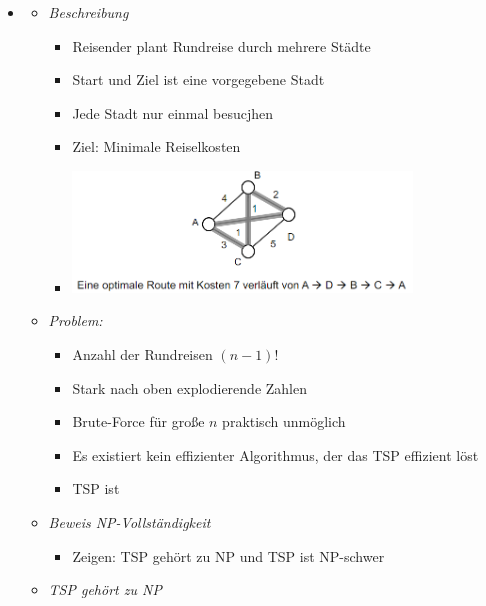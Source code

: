 \documentclass[
    12pt,
    a4paper,
    ngerman,
    color=3b,%
    marginpar=false,
    colorback=false,
    leqno,
]{tudaexercise}
\begin{document}
\begin{itemize}
          \pagebreak

    \item {}
          \begin{itemize}
              \item \textit{Beschreibung}
                    \begin{itemize}
                        \item Reisender plant Rundreise durch mehrere Städte
                        \item Start und Ziel ist eine vorgegebene Stadt
                        \item Jede Stadt nur einmal besucjhen
                        \item Ziel: Minimale Reiselkosten
                        \item[] \includegraphics[width=9cm]{pictures/tsp1.PNG}
                    \end{itemize}
              \item \textit{Problem:}
                    \begin{itemize}
                        \item Anzahl der Rundreisen $(n-1)!$
                        \item Stark nach oben explodierende Zahlen
                        \item Brute-Force für große $n$ praktisch unmöglich
                        \item Es existiert kein effizienter Algorithmus, der das TSP effizient löst
                        \item TSP ist 
                    \end{itemize}
              \item \textit{Beweis NP-Vollständigkeit}
                    \begin{itemize}
                        \item Zeigen: TSP gehört zu NP und TSP ist NP-schwer
                    \end{itemize}
              \item \textit{TSP gehört zu NP}
                    \begin{itemize}

\end{itemize}
\end{itemize}
\end{itemize}
\end{document}
